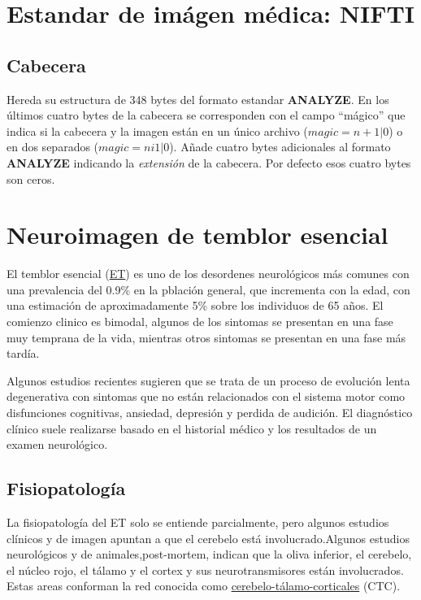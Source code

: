 \section{Estandar de imágen médica: NIFTI}

\subsection{Cabecera}

Hereda su estructura de 348 bytes del formato estandar \textbf{ANALYZE}. En los últimos cuatro bytes de la cabecera se corresponden con el campo ``mágico'' que indica si la cabecera y la imagen están en un único archivo ($magic = n+1|0$) o en dos separados ($magic = ni1|0$). Añade cuatro bytes adicionales al formato \textbf{ANALYZE} indicando la \textit{extensión} de la cabecera. Por defecto esos cuatro bytes son ceros.

\section{Neuroimagen de temblor esencial}

El temblor esencial (\hyperref[glos:et]{ET}) es uno de los desordenes neurológicos más comunes con una prevalencia del 0.9\% en la pblación general, que incrementa con la edad, con una estimación de aproximadamente 5\% sobre los individuos de 65 años. El comienzo clinico es bimodal, algunos de los sintomas se presentan en una fase muy temprana de la vida, mientras otros sintomas se presentan en una fase más tardía. \cite{movedisorder,ethandbook}

Algunos estudios recientes sugieren que se trata de un proceso de evolución lenta degenerativa con sintomas que no están relacionados con el sistema motor como disfunciones cognitivas, ansiedad, depresión y perdida de audición.
El diagnóstico clínico suele realizarse basado en el historial médico y los resultados de un examen neurológico. \cite{movedisorder}

\subsection{Fisiopatología}

La fisiopatología del ET solo se entiende parcialmente, pero algunos estudios clínicos y de imagen apuntan a que el cerebelo está involucrado.Algunos estudios neurológicos y de animales,post-mortem, indican que la oliva inferior, el cerebelo, el núcleo rojo, el tálamo y el cortex y sus neurotransmisores están involucrados. Estas areas conforman la red conocida como \hyperref[te:cerebelo-talamo-cortex]{cerebelo-tálamo-corticales} (CTC).\cite{rolectc,neuessentialsinet}

